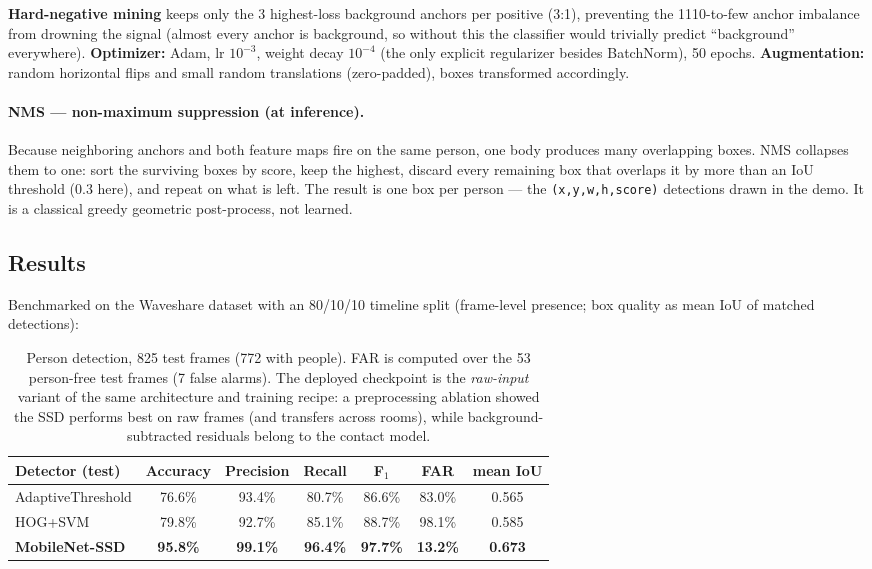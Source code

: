 \documentclass[11pt]{article}
\newcommand{\code}[1]{\texttt{\small #1}}
\begin{document}
\textbf{Hard-negative mining} keeps only the 3 highest-loss background
anchors per positive (3:1), preventing the 1110-to-few anchor imbalance
from drowning the signal (almost every anchor is background, so without
this the classifier would trivially predict ``background'' everywhere).
\textbf{Optimizer:} Adam, lr $10^{-3}$, weight decay $10^{-4}$ (the only
explicit regularizer besides BatchNorm), 50 epochs. \textbf{Augmentation:}
random horizontal flips and small random translations (zero-padded), boxes
transformed accordingly.

\paragraph{NMS --- non-maximum suppression (at inference).}
Because neighboring anchors and both feature maps fire on the same person,
one body produces many overlapping boxes. NMS collapses them to one: sort
the surviving boxes by score, keep the highest, discard every remaining box
that overlaps it by more than an IoU threshold (0.3 here), and repeat on
what is left. The result is one box per person --- the
\code{(x,y,w,h,score)} detections drawn in the demo. It is a classical
greedy geometric post-process, not learned.

\subsection{Results}

Benchmarked on the Waveshare dataset with an 80/10/10 timeline split
(frame-level presence; box quality as mean IoU of matched detections):

\begin{table}[H]\centering\small
\begin{tabular}{lcccccc}
\toprule
Detector (test) & Accuracy & Precision & Recall & F$_1$ & FAR & mean IoU\\
\midrule
AdaptiveThreshold & 76.6\% & 93.4\% & 80.7\% & 86.6\% & 83.0\% & 0.565\\
HOG+SVM           & 79.8\% & 92.7\% & 85.1\% & 88.7\% & 98.1\% & 0.585\\
\textbf{MobileNet-SSD} & \textbf{95.8\%} & \textbf{99.1\%} & \textbf{96.4\%} & \textbf{97.7\%} & \textbf{13.2\%} & \textbf{0.673}\\
\bottomrule
\end{tabular}
\caption{Person detection, 825 test frames (772 with people). FAR is
computed over the 53 person-free test frames (7 false alarms). The deployed
checkpoint is the \emph{raw-input} variant of the same architecture and
training recipe: a preprocessing ablation showed the SSD performs best on
raw frames (and transfers across rooms), while background-subtracted
residuals belong to the contact model.}
\end{table}
\end{document}
